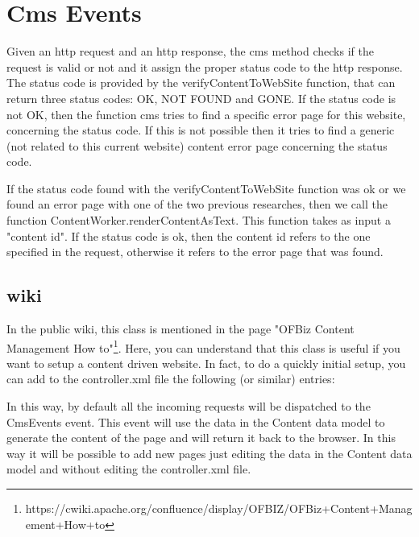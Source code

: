 \section{Cms Events}

Given an http request and an http response, the cms method checks if the request is valid or not and it assign the proper status code to the http response. The status code is provided by the verifyContentToWebSite function, that can return three status codes: OK, NOT FOUND and GONE. If the status code is not OK, then the function cms tries to find a specific error page for this website, concerning the status code. If this is not possible then it tries to find a generic (not related to this current website) content error page concerning the status code.

If the status code found with the verifyContentToWebSite function was ok or we found an error page with one of the two previous researches, then we call the function ContentWorker.renderContentAsText.
This function takes as input a "content id". If the status code is ok, then the content id refers to the one specified in the request, otherwise it refers to the error page that was found.

\subsection{wiki}

In the public wiki, this class is mentioned in the page "OFBiz Content Management How to"\footnote{https://cwiki.apache.org/confluence/display/OFBIZ/OFBiz+Content+Management+How+to}. Here, you can understand that this class is useful if you want to setup a content driven website. In fact, to do a quickly initial setup, you can add to the controller.xml file the following (or similar) entries:

    
    
In this way, by default all the incoming requests will be dispatched to the CmsEvents event.
This event will use the data in the Content data model to generate the content of the page and will return it back to the browser.
In this way it will be possible to add new pages just editing the data in the Content data model and without editing the controller.xml file.




